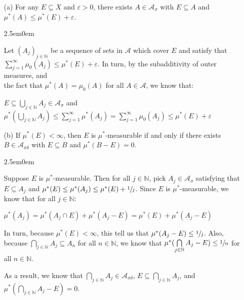 \documentclass{book}
\newcommand{\exTwoP}{%
   \color{RedViolet}%
   \fontsize{13}{15}\selectfont%
}
\newenvironment{myIndent}{%
   \begin{adjustwidth}{2.5em}{0em}%
}{%
   \end{adjustwidth}%
}
\newcommand{\retTwo}{\hfill\bigbreak}
\begin{document}
\begin{enumerate}
   \item[(a)] For any $E \subseteq X$ and $\varepsilon > 0$, there exists $A \in \mathcal{A}_\sigma$ with $E \subseteq A$ and $\mu^*(A) \leq \mu^*(E) + \varepsilon$.
   
   \begin{myIndent}\exTwoP
      Let $(A_j)_{j \in \mathbb{N}}$ be a sequence of sets in $\mathcal{A}$ which cover $E$ and satisfy that\\ $\sum\limits_{j=1}^\infty \mu_0(A_j) \leq \mu^*(E) + \varepsilon$. In turn, by the subadditivity of outer measures, and\\ [1pt] the fact that $\mu^*(A) = \mu_0(A)$ for all $A \in \mathcal{A}$, we know that:

      {\centering $E \subseteq \bigcup\limits_{j \in \mathbb{N}}A_j \in \mathcal{A}_{\sigma}$ and $\mu^*(\bigcup\limits_{j \in \mathbb{N}}A_j) \leq \sum\limits_{j=1}^\infty \mu^*(A_j) = \sum\limits_{j=1}^\infty \mu_0(A_j) \leq \mu^*(E) + \varepsilon$ \retTwo\par}
   \end{myIndent}
   
   \item[(b)] If $\mu^*(E) < \infty$, then $E$ is $\mu^*$-measurable if and only if there exists $B \in \mathcal{A}_{\sigma\delta}$ with $E \subseteq B$ and $\mu^*(B - E) = 0$.
   
   \begin{myIndent}\exTwoP
      Suppose $E$ is $\mu^*$-measurable. Then for all $j \in \mathbb{N}$, pick $A_j \in \mathcal{A}_{\sigma}$ satisfying that\\ $E \subseteq A_j$ and $\mu^*(E) \leq \mu^*(A_j) \leq \mu^*(E) + \sfrac{1}{j}$. Since $E$ is $\mu^*$-measurable, we\\ know that for all $j \in \mathbb{N}$:

      {\centering $\mu^*(A_j) = \mu^*(A_j \cap E) + \mu^*(A_j - E) = \mu^*(E) + \mu^*(A_j - E)$ \retTwo\par}

      In turn, because $\mu^*(E) < \infty$, this tell us that $\mu^*(A_j - E) \leq \sfrac{1}{j}$. Also, because $\bigcap\limits_{j \in \mathbb{N}}A_j \subseteq A_n$ for all $n \in \mathbb{N}$, we know that $\mu^*(\bigcap\limits_{j\in\mathbb{N}}A_j - E) \leq \sfrac{1}{n}$ for all $n \in \mathbb{N}$.\retTwo

      As a result, we know that $\bigcap\limits_{j \in \mathbb{N}}A_j \in \mathcal{A}_{\sigma\delta}$, $E \subseteq \bigcap\limits_{j \in \mathbb{N}}A_j$, and $\mu^*(\bigcap\limits_{j\in\mathbb{N}}A_j - E) = 0$.\retTwo


\end{myIndent}
\end{enumerate}
\end{document}

